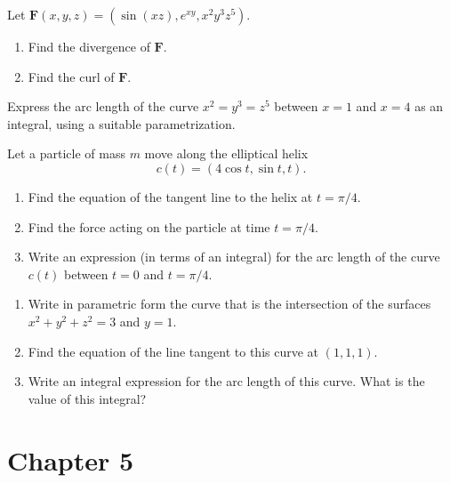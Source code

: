 \documentclass[openany]{book}
\begin{document}
\begin{prob}[10]
    Let \( \mathbf{F}(x, y, z) = (\sin(xz), e^{xy}, x^2y^3z^5) \).

    \begin{enumerate}
        \item[(a)] Find the divergence of \( \mathbf{F} \).
        \item[(b)] Find the curl of \( \mathbf{F} \).
    \end{enumerate}
\end{prob}

\begin{prob}[13]
    Express the arc length of the curve \( x^2 = y^3 = z^5 \) between \( x = 1 \) and \( x = 4 \) as an integral, using a suitable parametrization.
\end{prob}

\begin{prob}[34]
    Let a particle of mass \( m \) move along the elliptical helix  
    \[
    c(t) = (4 \cos t, \sin t, t).
    \]  

    \begin{enumerate}
        \item[(a)] Find the equation of the tangent line to the helix at \( t = \pi / 4 \).  
        \item[(b)] Find the force acting on the particle at time \( t = \pi / 4 \).  
        \item[(c)] Write an expression (in terms of an integral) for the arc length of the curve \( c(t) \) between \( t = 0 \) and \( t = \pi / 4 \).
    \end{enumerate}
\end{prob}

\begin{prob}[36]
    \begin{enumerate}
        \item[(a)] Write in parametric form the curve that is the intersection of the surfaces \( x^2 + y^2 + z^2 = 3 \) and \( y = 1 \).
        \item[(b)]  Find the equation of the line tangent to this curve at \((1, 1, 1)\).
        \item[(c)] Write an integral expression for the arc length of this curve. What is the value of this integral?
    \end{enumerate}
\end{prob}


\section{Chapter 5}
\end{document}
